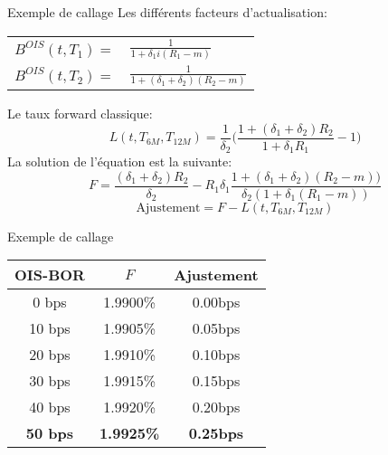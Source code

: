 \documentclass{beamer}
\begin{document}
\begin{frame}{Exemple de callage}
\small
Les différents facteurs d'actualisation:
\begin{center}
\begin{tabular}{r l}
$B^{OIS}(t,T_1)=$ & $\frac{1}{1+\delta_1 i(R_1-m)}$ \\
$B^{OIS}(t,T_2)=$ & $\frac{1}{1+(\delta_1 + \delta_2) (R_2-m)}$ \\
\end{tabular}
\end{center}
Le taux forward classique:
\[
L(t,T_{6M},T_{12M})=\frac{1}{\delta_2}\big(\frac{1+(\delta_1+\delta_2) R_2}{1+\delta_1 R_1}-1\big)
\]
La solution de l'équation est la suivante:
\[
F=\frac{(\delta_1+\delta_2) R_2}{\delta_2}-R_1 \delta_1 \frac{1+(\delta_1+\delta_2) (R_2-m))}{\delta_2 (1+\delta_1 (R_1-m))}
\]
\[
\text{Ajustement}=F-L(t,T_{6M},T_{12M})
\]
\end{frame}

\begin{frame}{Exemple de callage}

\begin{center}
\begin{tabular}{|c|c|c|}  
\hline  
OIS-BOR & $F$ & Ajustement \\ 
\hline  
0 bps & 1.9900\%&0.00bps\\ 
10 bps & 1.9905\%&0.05bps\\ 
20 bps & 1.9910\%&0.10bps\\ 
30 bps & 1.9915\%&0.15bps\\ 
40 bps & 1.9920\%&0.20bps\\ 
\textbf{\color{red}50 bps} & \textbf{\color{red}1.9925\%}&\textbf{\color{red}0.25bps}\\ 
\hline 
\end{tabular}
\end{center}

\end{frame}
\end{document}
